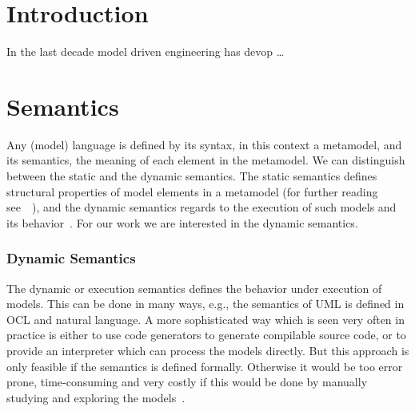 \documentclass{llncs}
\begin{document}

\section{Introduction}
In the last decade model driven engineering has devop  \dots


\section{Semantics}
\label{sec:semantics}
Any (model) language is defined by its syntax, in this context a metamodel, and its semantics, the meaning of each element in the metamodel. We can distinguish between the static and the dynamic semantics. The static semantics defines structural properties of model elements in a metamodel (for further reading see~\cite{jour:10}~\cite{jour:3}), and the dynamic semantics regards to the execution of such models and its behavior~\cite{jour:3}. For our work we are interested in the dynamic semantics.

\subsubsection{Dynamic Semantics}
The dynamic or execution semantics defines the behavior under execution of models. This can be done in many ways, e.g., the semantics of UML is defined in OCL and natural language. A more sophisticated way which is seen very often in practice is either to use code generators to generate compilable source code, or to provide an interpreter which can process the models directly. But this approach is only feasible if the semantics is defined formally. Otherwise it would be too error prone, time-consuming and very costly if this would be done by manually studying and exploring the models~\cite{jour:3}.
\end{document}
